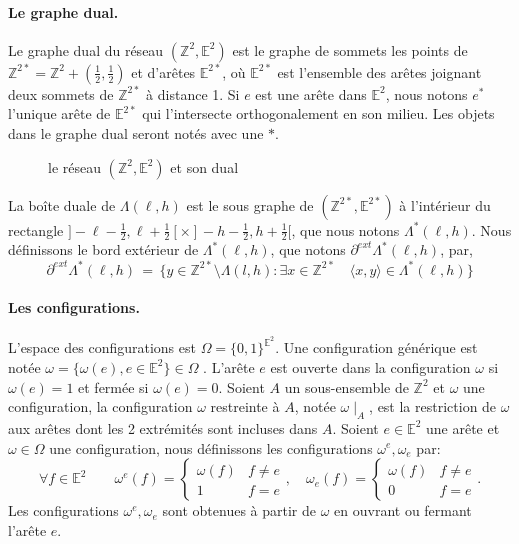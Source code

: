 \documentclass[titlepage,a4paper,12pt]{article}
\begin{document}
\paragraph{Le graphe dual.}Le graphe dual du réseau $(\mathbb{Z}^2,\mathbb{E}^2)$ est le graphe de sommets les points de $ \mathbb{Z}^{2*} = \mathbb{Z}^2+(\frac{1}{2},\frac{1}{2})$ et d'arêtes $\mathbb{E}^{2*}$, où $\mathbb{E}^{2*}$ est l'ensemble des arêtes joignant deux sommets de $\mathbb{Z}^{2*}$ à distance 1. Si $e$ est une arête dans $\mathbb{E}^2$, nous notons $e^*$ l'unique arête de $\mathbb{E}^{2*}$ qui l'intersecte orthogonalement en son milieu. Les objets dans le graphe dual seront notés avec une $*$.
\begin{figure}[h]
\center
{}
\caption{le réseau $(\mathbb{Z}^2,\mathbb{E}^2)$ et son dual}
\end{figure}
La boîte duale de $\Lambda(\ell,h)$ est le sous graphe de $(\mathbb{Z}^{2*},\mathbb{E}^{2*})$ à l'intérieur du rectangle $]-\ell -\frac{1}{2},\ell+\frac{1}{2}[\times ]-h-\frac{1}{2},h+\frac{1}{2}[$, que nous notons $\Lambda^*(\ell,h)$. Nous définissons le bord extérieur de $\Lambda^*(\ell,h)$, que notons $\partial^{ext}\Lambda^*(\ell,h)$, par,
$$\partial^{ext}\Lambda^*(\ell,h) \,=\, \big\{y\in \mathbb{Z}^{2*}\setminus \Lambda(l,h): \exists x\in \mathbb{Z}^{2*} \quad \langle x,y\rangle \in \Lambda^*(\ell,h) \big\}
$$
\paragraph{Les configurations.} L'espace des configurations est $\Omega = \{0,1\}^{\mathbb{E}^2}$. Une configuration générique est notée $\omega = \{\omega(e), e\in \mathbb{E}^2\} \in \Omega$ . L'arête $e$ est ouverte dans la configuration $\omega$ si $\omega(e) = 1$ et fermée si $\omega(e)= 0$. 
Soient $A$ un sous-ensemble de $\mathbb{Z}^2$ et $\omega$ une configuration, la configuration $\omega$ restreinte à $A$, notée $\omega\mid_{ A}$, est la restriction de $\omega$ aux arêtes dont les 2 extrémités sont incluses dans $A$.
Soient $e\in \mathbb{E}^2$ une arête et $\omega\in \Omega$ une configuration, nous définissons les configurations $\omega^e,\omega_e$ par:
$$
 \forall f\in \mathbb{E}^2 \qquad\omega^e(f) = \left\lbrace \begin{array}{cc}
	\omega(f) & f\neq e \\
	1 & f=e 
 \end{array}\right., \quad
 \omega_e(f) = \left\lbrace \begin{array}{cc}
	\omega(f) & f\neq e \\
	0 & f=e
 \end{array}\right..
$$
Les configurations $\omega^e,\omega_e$ sont obtenues à partir de $\omega$ en ouvrant ou fermant l'arête $e$.
\end{document}
